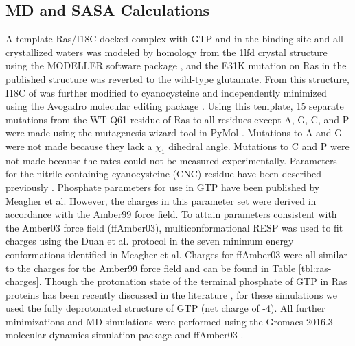 \subsection{MD and SASA Calculations} 

A template Ras/\RalB{}I18C docked complex with GTP and  in the binding site and all crystallized waters was modeled by homology from the 1lfd crystal structure\cite{Huang1998} using the MODELLER software package \cite{Marti-Renom2000, Sali1993, Fiser2000}, and the E31K mutation on Ras in the published structure was reverted to the wild-type glutamate. 
From this structure, I18C of \RalB{} was further modified to cyanocysteine and independently minimized using the Avogadro molecular editing package \cite{Hanwell2012}. 
Using this template, 15 separate mutations from the WT Q61 residue of Ras to all residues except A, G, C, and P were made using the mutagenesis wizard tool in PyMol \cite{DeLano2002}.
Mutations to A and G were not made because they lack a $\chi_1$ dihedral angle. 
Mutations to C and P were not made because the rates could not be measured experimentally.
Parameters for the nitrile-containing cyanocysteine (CNC) residue have been described previously \cite{Stafford2010, Ensign2011}.
Phosphate parameters for use in GTP have been published by Meagher et al\cite{Meagher2003}.
However, the charges in this parameter set were derived in accordance with the Amber99 force field. 
To attain parameters consistent with the Amber03 force field (ffAmber03), multiconformational RESP\cite{Cornell1993, Bayly1993, Cieplak1995} was used to fit charges using the Duan et al. protocol\cite{Duan2003} in the seven minimum energy conformations identified in Meagher et al. 
Charges for ffAmber03 were all similar to the charges for the Amber99 force field and can be found in Table \ref{tbl:ras-charges}. 
Though the protonation state of the terminal phosphate of GTP in Ras proteins has been recently discussed in the literature \cite{Knihtila2015, Mann2018}, for these simulations we used the fully deprotonated structure of GTP (net charge of -4). 
All further minimizations and MD simulations were performed using the Gromacs 2016.3 molecular dynamics simulation package\cite{Berendsen1995, Lindahl2001, VanDerSpoel2005, Miyake-Stoner2009, Hess2008, Pronk2013, Pall2015, Abraham2015} and ffAmber03 \cite{Duan2003, Sorin2005}.

